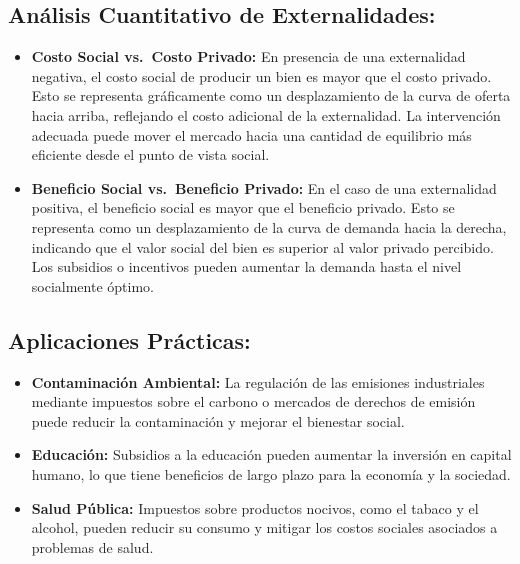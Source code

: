 \documentclass[
  letterpaper,
  DIV=11,
  numbers=noendperiod]{scrreport}
\begin{document}
\hypertarget{anuxe1lisis-cuantitativo-de-externalidades}{%
\subsection{Análisis Cuantitativo de
Externalidades:}\label{anuxe1lisis-cuantitativo-de-externalidades}}

\begin{itemize}
\item
  \textbf{Costo Social vs.~Costo Privado:} En presencia de una
  externalidad negativa, el costo social de producir un bien es mayor
  que el costo privado. Esto se representa gráficamente como un
  desplazamiento de la curva de oferta hacia arriba, reflejando el costo
  adicional de la externalidad. La intervención adecuada puede mover el
  mercado hacia una cantidad de equilibrio más eficiente desde el punto
  de vista social.
\item
  \textbf{Beneficio Social vs.~Beneficio Privado:} En el caso de una
  externalidad positiva, el beneficio social es mayor que el beneficio
  privado. Esto se representa como un desplazamiento de la curva de
  demanda hacia la derecha, indicando que el valor social del bien es
  superior al valor privado percibido. Los subsidios o incentivos pueden
  aumentar la demanda hasta el nivel socialmente óptimo.
\end{itemize}

\hypertarget{aplicaciones-pruxe1cticas}{%
\subsection{Aplicaciones Prácticas:}\label{aplicaciones-pruxe1cticas}}

\begin{itemize}
\item
  \textbf{Contaminación Ambiental:} La regulación de las emisiones
  industriales mediante impuestos sobre el carbono o mercados de
  derechos de emisión puede reducir la contaminación y mejorar el
  bienestar social.
\item
  \textbf{Educación:} Subsidios a la educación pueden aumentar la
  inversión en capital humano, lo que tiene beneficios de largo plazo
  para la economía y la sociedad.
\item
  \textbf{Salud Pública:} Impuestos sobre productos nocivos, como el
  tabaco y el alcohol, pueden reducir su consumo y mitigar los costos
  sociales asociados a problemas de salud.
\end{itemize}
\end{document}
